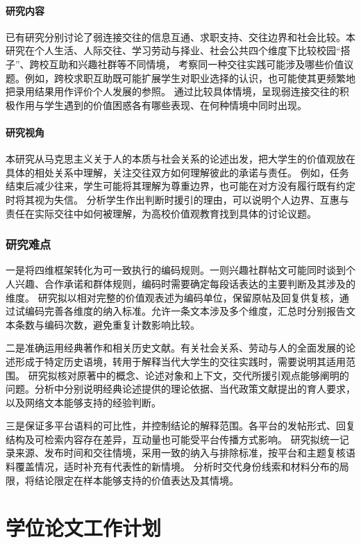 \paragraph{研究内容}
已有研究分别讨论了弱连接交往的信息互通、求职支持、交往边界和社会比较。本研究在个人生活、人际交往、学习劳动与择业、社会公共四个维度下比较校园“搭子”、跨校互助和兴趣社群等不同情境，
考察同一种交往实践可能涉及哪些价值议题。例如，跨校求职互助既可能扩展学生对职业选择的认识，也可能使其更频繁地把录用结果用作评价个人发展的参照。
通过比较具体情境，呈现弱连接交往的积极作用与学生遇到的价值困惑各有哪些表现、在何种情境中同时出现。

\paragraph{研究视角}
本研究从马克思主义关于人的本质与社会关系的论述出发，把大学生的价值观放在具体的相处关系中理解，关注交往双方如何理解彼此的承诺与责任。
例如，任务结束后减少往来，学生可能将其理解为尊重边界，也可能在对方没有履行既有约定时将其视为失信。
分析学生作出判断时援引的理由，可以说明个人边界、互惠与责任在实际交往中如何被理解，为高校价值观教育找到具体的讨论议题。

\subsubsection{研究难点}

一是将四维框架转化为可一致执行的编码规则。一则兴趣社群帖文可能同时谈到个人兴趣、合作承诺和群体规则，编码时需要确定每段话表达的主要判断及其涉及的维度。
研究拟以相对完整的价值观表述为编码单位，保留原帖及回复供复核，通过试编码完善各维度的纳入标准。允许一条文本涉及多个维度，汇总时分别报告文本条数与编码次数，避免重复计数影响比较。

二是准确运用经典著作和相关历史文献。有关社会关系、劳动与人的全面发展的论述形成于特定历史语境，转用于解释当代大学生的交往实践时，需要说明其适用范围。
研究拟核对原著中的概念、论述对象和上下文，交代所援引观点能够阐明的问题。分析中分别说明经典论述提供的理论依据、当代政策文献提出的育人要求，以及网络文本能够支持的经验判断。

三是保证多平台语料的可比性，并控制结论的解释范围。各平台的发帖形式、回复结构及可检索内容存在差异，互动量也可能受平台传播方式影响。
研究拟统一记录来源、发布时间和交往情境，采用一致的纳入与排除标准，按平台和主题复核语料覆盖情况，适时补充有代表性的新情境。
分析时交代身份线索和材料分布的局限，将结论限定在样本能够支持的价值表达及其情境。

\section{学位论文工作计划}
\label{sec:work-plan}

